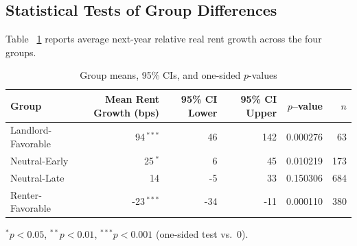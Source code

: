 \documentclass[APA,Times1COL]{WileyNJDv5} %
\begin{document}

\subsection{Statistical Tests of Group Differences}
 Table ~\ref{tab:group_stats} reports average next-year relative real rent growth across the four groups.


	
\begin{table}[ht]
	\centering
	\caption{Group means, 95\% CIs, and one‐sided \(p\)-values}
	\label{tab:group_stats}
	\begin{tabular}{lrrrrr}
		\toprule
		Group & Mean Rent Growth (bps) & 95\% CI Lower & 95\% CI Upper & \(p\)–value & \(n\) \\
		\midrule
		Landlord-Favorable  &  94\(\,^{***}\) &   46 & 142 & 0.000276 &  63 \\
		Neutral-Early             &  25\(\,^{*}\)   &    6 &  45 & 0.010219 & 173 \\
		Neutral-Late         &  14             &   -5 &  33 & 0.150306 & 684 \\
		Renter‐Favorable    & -23\(\,^{***}\) &  -34 & -11 & 0.000110 & 380 \\
		\bottomrule
	\end{tabular}
	
	\vspace{0.5ex}
	\footnotesize{\(^{*}p<0.05\), \(^{**}p<0.01\), \(^{***}p<0.001\) (one‐sided test vs.\ 0).}
\end{table}
\end{document}
